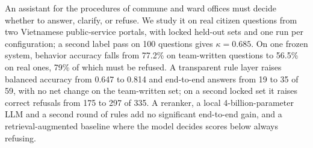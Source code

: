 An assistant for the procedures of commune and ward offices must decide whether to answer, clarify, or refuse. We study it on
real citizen questions from two Vietnamese public-service portals, with locked held-out sets and one run per configuration; a second label pass on 100 questions gives $\kappa=0.685$. On one frozen system, behavior accuracy falls from 77.2\%
on team-written questions to 56.5\% on real ones, 79\% of which must be refused. A transparent rule layer
raises balanced accuracy from 0.647 to 0.814 and end-to-end answers from 19 to 35 of 59, with no net change on
the team-written set; on a second locked set it raises correct refusals from 175 to 297 of 335. A reranker, a local 4-billion-parameter
LLM and a second round of rules add no significant end-to-end gain, and a retrieval-augmented baseline where the model decides scores
below always refusing.
